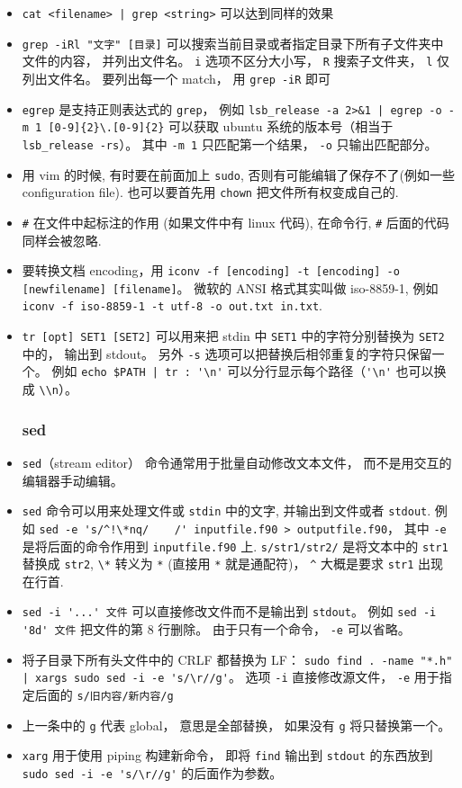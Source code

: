 \begin{itemize}
\item \verb`cat <filename> | grep <string>` 可以达到同样的效果
\item \verb`grep -iRl "文字" [目录]` 可以搜索当前目录或者指定目录下所有子文件夹中文件的内容， 并列出文件名。 \verb`i` 选项不区分大小写， \verb`R` 搜索子文件夹， \verb`l` 仅列出文件名。 要列出每一个 match， 用 \verb`grep -iR` 即可
\item \verb|egrep| 是支持正则表达式的 \verb|grep|， 例如 \verb`lsb_release -a 2>&1 | egrep -o -m 1 [0-9]{2}\.[0-9]{2}` 可以获取 ubuntu 系统的版本号（相当于 \verb|lsb_release -rs|）。 其中 \verb|-m 1| 只匹配第一个结果， \verb|-o| 只输出匹配部分。
\item 用 vim 的时候, 有时要在前面加上 \verb`sudo`, 否则有可能编辑了保存不了(例如一些 configuration file). 也可以要首先用 \verb`chown` 把文件所有权变成自己的.
\item \verb`#` 在文件中起标注的作用 (如果文件中有 linux 代码), 在命令行, \verb`#` 后面的代码同样会被忽略.
\item 要转换文档 encoding，用 \verb|iconv -f [encoding] -t [encoding] -o [newfilename] [filename]|。 微软的 ANSI 格式其实叫做 iso-8859-1, 例如 \verb`iconv -f iso-8859-1 -t utf-8 -o out.txt in.txt`.
\item \verb|tr [opt] SET1 [SET2]| 可以用来把 stdin 中 \verb|SET1| 中的字符分别替换为 \verb|SET2| 中的， 输出到 stdout。 另外 \verb|-s| 选项可以把替换后相邻重复的字符只保留一个。 例如 \verb`echo $PATH | tr : '\n'` 可以分行显示每个路径（\verb|'\n'| 也可以换成 \verb|\\n|）。

\subsubsection{sed}
\item \verb|sed|（stream editor） 命令通常用于批量自动修改文本文件， 而不是用交互的编辑器手动编辑。
\item \verb`sed` 命令可以用来处理文件或 \verb|stdin| 中的文字, 并输出到文件或者 \verb|stdout|. 例如
\verb|sed -e 's/^!\*nq/    /' inputfile.f90 > outputfile.f90|， 其中 \verb`-e` 是将后面的命令作用到 \verb`inputfile.f90` 上. \verb`s/str1/str2/` 是将文本中的 \verb`str1` 替换成 \verb`str2`, \verb`\*` 转义为 \verb`*` (直接用 \verb`*` 就是通配符)， \verb`^` 大概是要求 \verb`str1` 出现在行首.
\item \verb|sed -i '...' 文件| 可以直接修改文件而不是输出到 \verb|stdout|。 例如 \verb|sed -i '8d' 文件| 把文件的第 8 行删除。 由于只有一个命令， \verb|-e| 可以省略。
\item 将子目录下所有头文件中的 CRLF 都替换为 LF： \verb`sudo find . -name "*.h" | xargs sudo sed -i -e 's/\r//g'`。 选项 \verb`-i` 直接修改源文件， \verb`-e` 用于指定后面的 \verb`s/旧内容/新内容/g`
\item 上一条中的 \verb|g| 代表 global， 意思是全部替换， 如果没有 \verb|g| 将只替换第一个。
\item \verb`xarg` 用于使用 piping 构建新命令， 即将 \verb|find| 输出到 \verb|stdout| 的东西放到 \verb`sudo sed -i -e 's/\r//g'` 的后面作为参数。
\end{itemize}

